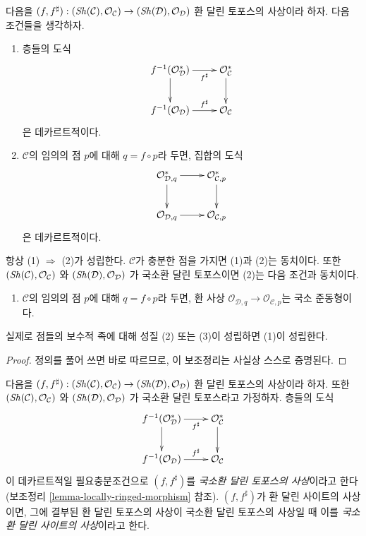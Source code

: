 \begin{lemma}
\label{lemma-locally-ringed-morphism}
다음을
$(f, f^\sharp) : (\mathop{\mathit{Sh}}\nolimits(\mathcal{C}), \mathcal{O}_\mathcal{C})
\to (\mathop{\mathit{Sh}}\nolimits(\mathcal{D}), \mathcal{O}_\mathcal{D})$
환 달린 토포스의 사상이라 하자. 다음 조건들을 생각하자.
\begin{enumerate}
\item 층들의 도식
$$
\xymatrix{
f^{-1}(\mathcal{O}^*_\mathcal{D}) \ar[r]_-{f^\sharp} \ar[d] &
\mathcal{O}^*_\mathcal{C} \ar[d] \\
f^{-1}(\mathcal{O}_\mathcal{D}) \ar[r]^-{f^\sharp} &
\mathcal{O}_\mathcal{C}
}
$$
은 데카르트적이다.
\item $\mathcal{C}$의 임의의 점 $p$에 대해 $q = f \circ p$라 두면,
집합의 도식
$$
\xymatrix{
\mathcal{O}^*_{\mathcal{D}, q} \ar[r] \ar[d] &
\mathcal{O}^*_{\mathcal{C}, p} \ar[d] \\
\mathcal{O}_{\mathcal{D}, q} \ar[r] &
\mathcal{O}_{\mathcal{C}, p}
}
$$
은 데카르트적이다.
\end{enumerate}
항상 (1) $\Rightarrow$ (2)가 성립한다. $\mathcal{C}$가 충분한 점을 가지면
(1)과 (2)는 동치이다. 또한
$(\mathop{\mathit{Sh}}\nolimits(\mathcal{C}), \mathcal{O}_\mathcal{C})$
와
$(\mathop{\mathit{Sh}}\nolimits(\mathcal{D}), \mathcal{O}_\mathcal{D})$
가 국소환 달린 토포스이면 (2)는 다음 조건과 동치이다.
\begin{enumerate}
\item[(3)] $\mathcal{C}$의 임의의 점 $p$에 대해 $q = f \circ p$라 두면,
환 사상 $\mathcal{O}_{\mathcal{D}, q} \to \mathcal{O}_{\mathcal{C}, p}$는
국소 준동형이다.
\end{enumerate}
실제로 점들의 보수적 족에 대해 성질 (2) 또는 (3)이 성립하면 (1)이 성립한다.
\end{lemma}

\begin{proof}
정의를 풀어 쓰면 바로 따르므로, 이 보조정리는 사실상 스스로 증명된다.
\end{proof}

\begin{definition}
\label{definition-morphism-locally-ringed-topoi}
다음을
$(f, f^\sharp) : (\mathop{\mathit{Sh}}\nolimits(\mathcal{C}), \mathcal{O}_\mathcal{C})
\to (\mathop{\mathit{Sh}}\nolimits(\mathcal{D}), \mathcal{O}_\mathcal{D})$
환 달린 토포스의 사상이라 하자. 또한
$(\mathop{\mathit{Sh}}\nolimits(\mathcal{C}), \mathcal{O}_\mathcal{C})$
와
$(\mathop{\mathit{Sh}}\nolimits(\mathcal{D}), \mathcal{O}_\mathcal{D})$
가 국소환 달린 토포스라고 가정하자. 층들의 도식
$$
\xymatrix{
f^{-1}(\mathcal{O}^*_\mathcal{D}) \ar[r]_-{f^\sharp} \ar[d] &
\mathcal{O}^*_\mathcal{C} \ar[d] \\
f^{-1}(\mathcal{O}_\mathcal{D}) \ar[r]^-{f^\sharp} &
\mathcal{O}_\mathcal{C}
}
$$
이 데카르트적일 필요충분조건으로 $(f, f^\sharp)$를
{\it 국소환 달린 토포스의 사상}이라고 한다
(보조정리 \ref{lemma-locally-ringed-morphism} 참조).
$(f, f^\sharp)$가 환 달린 사이트의 사상이면, 그에 결부된 환 달린
토포스의 사상이 국소환 달린 토포스의 사상일 때 이를
{\it 국소환 달린 사이트의 사상}이라고 한다.
\end{definition}

